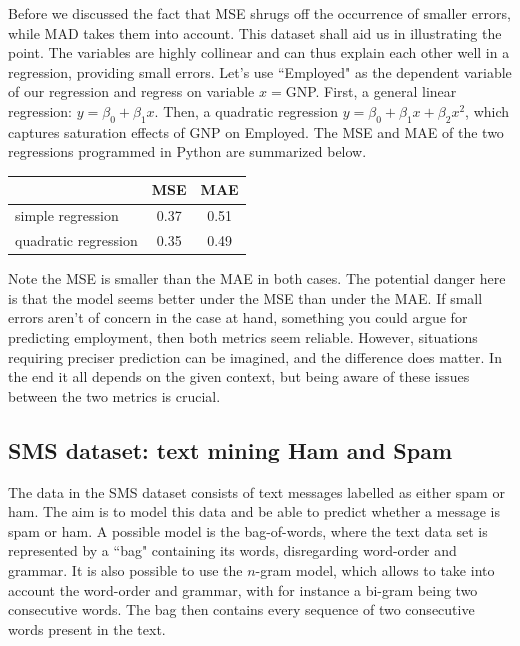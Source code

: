 \documentclass{llncs}
\begin{document}

Before we discussed the fact that MSE shrugs off the occurrence of smaller errors, while MAD takes them into account. This dataset shall aid us in illustrating the point. The variables are highly collinear and can thus explain each other well in a regression, providing small errors. Let's use ``Employed" as the dependent variable of our regression and regress on variable $x=$GNP. First, a general linear regression: $\displaystyle y = \beta_{0} + \beta_{1}x$. Then, a quadratic regression $\displaystyle y = \beta_{0} + \beta_{1}x +\beta_{2}x^{2}$, which captures saturation effects of GNP on Employed. The MSE and MAE of the two regressions programmed in Python are summarized below.
\begin{table}[H]
    \centering
    \begin{tabular}{l | c | c}
        & MSE & MAE\\ \hline
        simple regression & 0.37& 0.51 \\
        quadratic regression & 0.35 & 0.49
    \end{tabular}
    \label{table:MSE_vs_MAE}
\end{table}
\noindent Note the MSE is smaller than the MAE in both cases. The potential danger here is that the model seems better under the MSE than under the MAE. If small errors aren't of concern in the case at hand, something you could argue for predicting employment, then both metrics seem reliable. However, situations requiring preciser prediction can be imagined, and the difference does matter. In the end it all depends on the given context, but being aware of these issues between the two metrics is crucial.

\subsection{SMS dataset: text mining Ham and Spam}
The data in the SMS dataset consists of text messages labelled as either spam or ham. The aim is to model this data and be able to predict whether a message is spam or ham. A possible model is the bag-of-words, where the text data set is represented by a ``bag" containing its words, disregarding word-order and grammar. It is also possible to use the $n$-gram model, which allows to take into account the word-order and grammar, with for instance a bi-gram being two consecutive words. The bag then contains every sequence of two consecutive words present in the text. 
\end{document}
